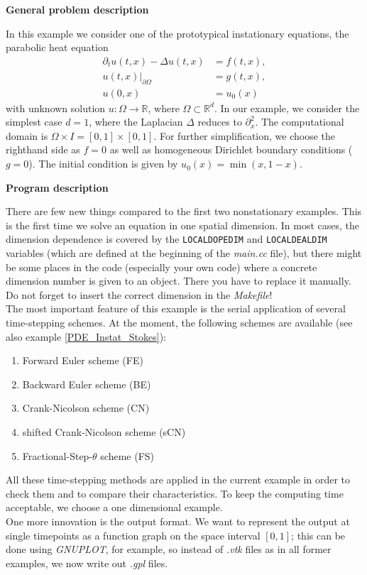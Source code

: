\textbf{General problem description}

\vspace{0.2cm}

In this example we consider one of the prototypical instationary equations, the parabolic heat equation
\begin{align*}
\partial_t u(t,x) - \Delta u(t,x) &= f(t,x),\\
u(t,x)|_{\partial \Omega} &= g(t,x),\\
u(0,x) &= u_0(x)
\end{align*}
with unknown solution $u:\Omega \rightarrow \mathbb{R}$, where $\Omega \subset \mathbb{R}^d$. In our example, we consider the simplest case $d=1$, where the Laplacian $\Delta$ reduces to $\partial_x^2$. The computational domain is $\Omega \times I = [0,1] \times [0,1]$. For further simplification, we choose the righthand side as $f=0$ as well as homogeneous Dirichlet boundary conditions ($g=0$). The initial condition is given by $u_0(x) = \min(x,1-x)$.
\vspace{0.2cm}

\textbf{Program description}

\vspace{0.2cm}

There are few new things compared to the first two nonstationary examples. This is the first time we solve an equation in one spatial dimension. In most cases, the dimension dependence is covered by the \texttt{LOCALDOPEDIM} and \texttt{LOCALDEALDIM} variables (which are defined at the beginning of the \textit{main.cc} file), but there might be some places in the code (especially your own code) where a concrete dimension number is given to an object. There you have to replace it manually. Do not forget to insert the correct dimension in the \textit{Makefile}!\\
The most important feature of this example is the serial application of several time-stepping schemes. At the moment, the following schemes are available (see also example \ref{PDE_Instat_Stokes}):
\begin{enumerate}
\item
Forward Euler scheme (FE)
\item
Backward Euler scheme (BE)
\item
Crank-Nicolson scheme (CN)
\item
shifted Crank-Nicolson scheme (sCN)
\item
Fractional-Step-$\theta$ scheme (FS)
\end{enumerate}
All these time-stepping methods are applied in the current example in order to check them and to compare their characteristics. To keep the computing time acceptable, we choose a one dimensional example.\\
One more innovation is the output format. We want to represent the output at single timepoints as a function graph on the space interval $[0,1]$; this can be done using \textit{GNUPLOT}, for example, so instead of \textit{.vtk} files as in all former examples, we now write out \textit{.gpl} files.